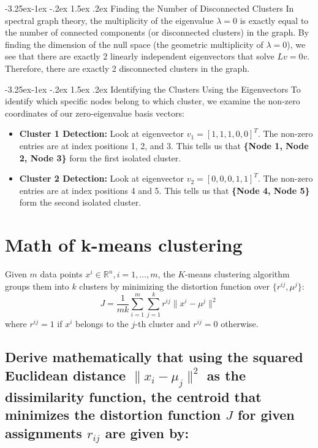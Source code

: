\documentclass[twoside, 10pt]{article}
\makeatletter
\renewcommand{\paragraph}{\@startsection{paragraph}{4}{\z@}%
    {-3.25ex\@plus -1ex \@minus -.2ex}%
    {1.5ex \@plus .2ex}%
    {\normalfont\normalsize\bfseries}}
\makeatother
\begin{document}
\paragraph{Finding the Number of Disconnected Clusters} 
In spectral graph theory, the multiplicity of the eigenvalue $\lambda = 0$ is exactly equal to the number of connected components (or disconnected clusters) in the graph. By finding the dimension of the null space (the geometric multiplicity of $\lambda = 0$), we see that there are exactly 2 linearly independent eigenvectors that solve $L v = 0v$. Therefore, there are exactly 2 disconnected clusters in the graph.

\paragraph{Identifying the Clusters Using the Eigenvectors} 
To identify which specific nodes belong to which cluster, we examine the non-zero coordinates of our zero-eigenvalue basis vectors:
\begin{itemize}
    \item \textbf{Cluster 1 Detection:} Look at eigenvector $v_1 = [1, 1, 1, 0, 0]^T$. The non-zero entries are at index positions 1, 2, and 3. This tells us that \textbf{\{Node 1, Node 2, Node 3\}} form the first isolated cluster.
    \item \textbf{Cluster 2 Detection:} Look at eigenvector $v_2 = [0, 0, 0, 1, 1]^T$. The non-zero entries are at index positions 4 and 5. This tells us that \textbf{\{Node 4, Node 5\}} form the second isolated cluster.
\end{itemize}

\section{Math of k-means clustering}

Given $m$ data points $x^i \in \mathbb{R}^n, i = 1, \dots, m$, the $K$-means clustering algorithm groups them into $k$ clusters by minimizing the distortion function over $\{r^{ij}, \mu^j\}$:
\begin{equation}
J = \frac{1}{mk} \sum_{i=1}^{m} \sum_{j=1}^{k} r^{ij} \|x^i - \mu^j\|^2
\end{equation}
where $r^{ij} = 1$ if $x^i$ belongs to the $j$-th cluster and $r^{ij} = 0$ otherwise.

\subsection{Derive mathematically that using the squared Euclidean distance $\|x_i - \mu_j\|^2$ as the dissimilarity function, the centroid that minimizes the distortion function $J$ for given assignments $r_{ij}$ are given by:}
\end{document}
